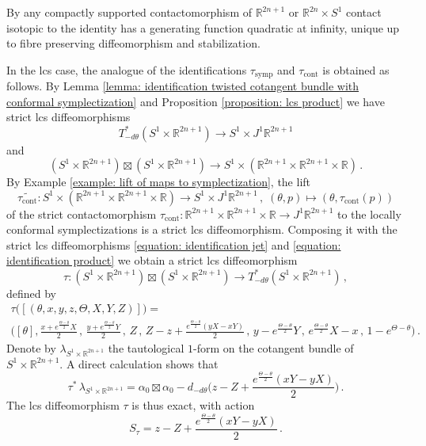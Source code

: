 \documentclass{amsart}
\newcommand{\R}{\mathbb{R}}
\DeclareMathOperator{\symp}{symp}
\DeclareMathOperator{\cont}{cont}
\theoremstyle{remark}
\begin{document}
By \cite{Chaperon, Chekanov, Viterbo, Theret}
any compactly supported contactomorphism
of $\mathbb{R}^{2n+1}$ or $\mathbb{R}^{2n} \times S^1$
contact isotopic to the identity
has a generating function quadratic at infinity,
unique up to fibre preserving diffeomorphism and stabilization.

In the lcs case,
the analogue of the identifications $\tau_{\symp}$ and $\tau_{\cont}$
is obtained as follows.
By Lemma \ref{lemma: identification twisted cotangent bundle with conformal symplectization}
and Proposition \ref{proposition: lcs product}
we have strict lcs diffeomorphisms
\begin{equation}\label{equation: identification jet}
T^{\ast}_{-d\theta} (S^1 \times \mathbb{R}^{2n+1})
\rightarrow S^1 \times J^1 \mathbb{R}^{2n+1}
\end{equation}
and 
\begin{equation}\label{equation: identification product}
(S^1 \times \mathbb{R}^{2n+1}) \boxtimes (S^1 \times \mathbb{R}^{2n+1})
\rightarrow S^1 \times ( \mathbb{R}^{2n+1} \times \mathbb{R}^{2n+1} \times \mathbb{R} ) \,.
\end{equation}
By Example \ref{example: lift of maps to symplectization},
the lift 
\[
\widetilde{\tau_{\cont}}:
S^1 \times (\R^{2n+1} \times \R^{2n+1} \times \R) \to S^1 \times J^1\R^{2n+1} \,,\;
(\theta, p) \mapsto (\theta, \tau_{\cont}(p))
\]
of the strict contactomorphism
$\tau_{\cont}:
\mathbb{R}^{2n+1} \times \mathbb{R}^{2n+1} \times \mathbb{R}
\rightarrow J^1 \mathbb{R}^{2n+1}$
to the locally conformal symplectizations
is a strict lcs diffeomorphism.
Composing it with the strict lcs diffeomorphisms
\eqref{equation: identification jet} and \eqref{equation: identification product}
we obtain a strict lcs diffeomorphism
\begin{equation}\label{equation: tau}
\tau: (S^1 \times \mathbb{R}^{2n+1}) \boxtimes (S^1 \times \mathbb{R}^{2n+1})
\rightarrow T^{\ast}_{-d\theta} (S^1 \times \mathbb{R}^{2n+1}) \,,
\end{equation}
defined by
\begin{gather*}
\tau \big( [(\theta, x, y, z, \Theta, X, Y, Z)] \big) =
\\
\Big([\theta], \frac{ x + e^{\frac{\Theta - \theta}{2}} X}{2} \,,\,
\frac{ y + e^{\frac{\Theta - \theta}{2}} Y}{2}
\,,\, Z \,,\,
Z - z
+ \frac{e^{\frac{ \Theta - \theta}{2}} (yX - xY)}{2} \,,\,
y - e^{\frac{\Theta - \theta}{2}} Y \,,\,
e^{\frac{\Theta - \theta}{2}} X - x \,,\,
1 - e^{\Theta - \theta} \Big) \,.
\end{gather*}
Denote by $\lambda_{S^1 \times \mathbb{R}^{2n+1}}$
the tautological $1$-form on the cotangent bundle of $S^1 \times \mathbb{R}^{2n+1}$.
A direct calculation shows that
\begin{equation}\label{tau*lambda}
\tau^{\ast} \, \lambda_{S^1 \times \mathbb{R}^{2n+1}}
= \alpha_0 \boxtimes \alpha_0
- d_{-d\theta} \Big( z - Z + \frac{e^{\frac{\Theta - \theta}{2}} (xY - yX) }{2} \Big) \,.
\end{equation}
The lcs diffeomorphism $\tau$ is thus exact,
with action
\[
S_{\tau} = z - Z + \frac{e^{\frac{\Theta - \theta}{2}} (xY - yX) }{2} \,.
\]
\end{document}
